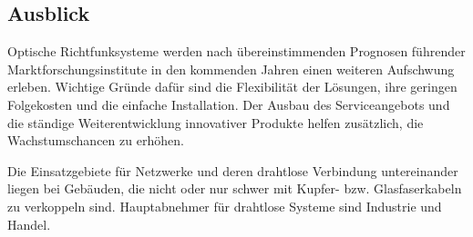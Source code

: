 \begin{multicols}{3}
\subsection*{Ausblick}
Optische Richtfunksysteme werden nach übereinstimmenden Prognosen führender Marktforschungsinstitute in den kommenden Jahren einen weiteren Aufschwung erleben. Wichtige Gründe dafür sind die Flexibilität der Lösungen, ihre geringen Folgekosten und die einfache Installation. Der Ausbau des Serviceangebots und die ständige Weiterentwicklung innovativer Produkte helfen zusätzlich, die Wachstumschancen zu erhöhen. 

Die Einsatzgebiete für Netzwerke und deren drahtlose Verbindung untereinander liegen bei Gebäuden, die nicht oder nur schwer mit Kupfer- bzw. Glasfaserkabeln zu verkoppeln sind. Hauptabnehmer für drahtlose Systeme sind Industrie und Handel. ~\cite{Laserlink.1}
\printbibliography[segment=20,heading=subbibliography]
\end{multicols}
\newpage
